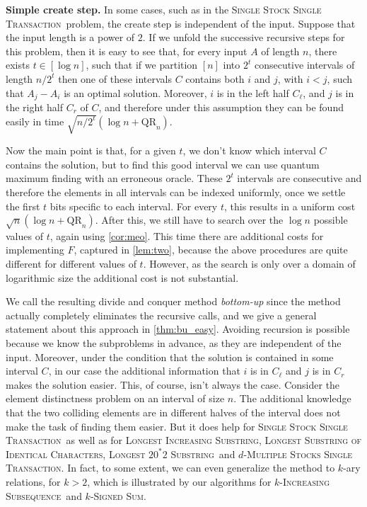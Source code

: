 \documentclass[12pt]{article}
\newcommand{\qr}{\mathrm{QR}}
\newcommand{\SSSTf}{\textsc{Single Stock Single Transaction}}
\newcommand{\LSICf}{\textsc{Longest Substring of Identical Characters}}
\newcommand{\LISstf}{\textsc{Longest Increasing Substring}}
\newcommand{\ISf}{\textsc{Increasing Subsequence}}
\newcommand{\LZSf}{\textsc{Longest} $20^*2$ \textsc{Substring}}
\newcommand{\SiSf}{\textsc{Signed Sum}}
\newcommand{\MSSTf}{\textsc{Multiple Stocks Single Transaction}}
\theoremstyle{definition}
\begin{document}
{\bf Simple create step.} In some cases, such as in the \SSSTf\ problem, the create step is independent of the input. 
Suppose that the input length is a power of $2$.
If we unfold the successive recursive steps for this problem, then it is easy to see that, for every input $A$ of length $n$, there exists $t \in [\log n]$, such that if we partition $[n]$ into $2^t$ consecutive intervals of length $n/2^t$ then one of these intervals $C$ contains both $i$ and $j$, with $i<j$, such that $A_j - A_i$ is an optimal solution.
Moreover, $i$ is in the left half $C_{\ell}$, and $j$ is in the right half $C_r$ of $C$, and therefore under this assumption they can be found easily in time $\sqrt{n/2^t} (\log n + \qr_n)$.

Now the main point is that, for a given $t$, we don't know which interval $C$ contains the solution, but to find this good interval we can use quantum maximum finding with an erroneous oracle.
These $2^t$ intervals are consecutive and therefore the elements in all intervals can be indexed uniformly, once we settle the first $t$ bits specific to each interval.
For every $t$, this results in a uniform cost $\sqrt{n} (\log n + \qr_n)$.
After this, we still have to search over the $\log n$ possible values of $t$, again using \cref{cor:meo}.
This time there are additional costs for implementing $F$, captured in \cref{lem:two}, because the above procedures are quite different for different values of $t$. However, as the search is only over a domain of logarithmic size the additional cost is not substantial.

We call the resulting divide and conquer method {\em bottom-up} since the method actually completely eliminates the recursive calls, and we give a general statement about this approach in \cref{thm:bu_easy}. Avoiding recursion is possible because we know the subproblems in advance, as they are independent of the input.
Moreover, under the condition that the solution is contained in some interval $C$, in our case the additional information that $i$ is in $C_{\ell}$ and $j$ is in $C_r$ makes the solution easier. 
This, of course, isn't always the case.
Consider the element distinctness problem on an interval of size $n$. The additional knowledge that the two colliding elements are in different halves of the interval does not make the task of finding them easier.  
But it does help for \SSSTf \ as well as for \LISstf, \LSICf, \LZSf \ and $d$-\MSSTf.
In fact, to some extent, we can even generalize the method to $k$-ary relations, for $k > 2$, which is illustrated by our algorithms for $k$-\ISf \ and $k$-\SiSf.  
\end{document}
